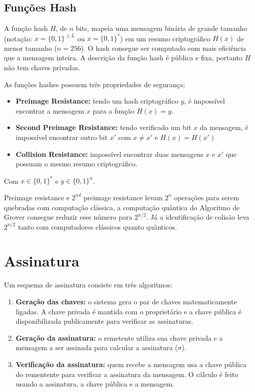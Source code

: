 \documentclass[12pt, a4paper]{report}
\begin{document}
\subsection{Funções Hash}
A função hash $H$, de $n$ bits, mapeia uma mensagem binária de grande tamanho (notação: $x = \{0,1\}^{\leq L}$ ou $x = \{0,1\}^{*}$) em um resumo criptográfico $H(x)$ de menor tamanho ($n = 256$). O hash consegue ser computado com mais eficiência que a mensagem inteira. A descrição da função hash é pública e fixa, portanto $H$ não tem chaves privadas.

As funções hashes possuem três propriedades de segurança:
\begin{itemize}
	\item \textbf{Preimage Resistance:} tendo um hash criptográfico $y$, é impossível encontrar a mensagem $x$ para a função $H(x) = y$.
	\item \textbf{Second Preimage Resistance:} tendo verificado um bit $x$ da mensagem, é impossível encontrar outro bit $x'$ com $x\neq x'$ e $H(x) = H(x')$
	\item \textbf{Collision Resistance:} impossível encontrar duas mensagens $x$ e $x'$ que possuam o mesmo resumo criptográfico.
\end{itemize}
Com $x \in \{0,1\}^*$ e $y \in \{0,1\}^n$.

Preimage resistance e $2^{nd}$ preimage resistance levam $2^n$ operações para serem quebradas com computação clássica, a computação quântica do Algoritmo de Grover consegue reduzir esse número para $2^{n/2}$. Já a identificação de colisão leva $2^{n/2}$ tanto com computadores clássicos quanto quânticos.


\section{Assinatura}
Um esquema de assinatura consiste em três algoritmos:
\begin{enumerate}
	\item \textbf{Geração das chaves:} o sistema gera o par de chaves matematicamente ligadas. A chave privada é mantida com o proprietário e a chave pública é disponibilizada publicamente para verificar as assinaturas.
	\item \textbf{Geração da assinatura:} o remetente utiliza sua chave privada e a mensagem a ser assinada para calcular a assinatura ($\sigma$).
	\item \textbf{Verificação da assinatura:} quem recebe a mensagem usa a chave pública do rementente para verificar a assinatura da mensagem. O cálculo é feito usando a assinatura, a chave pública e a mensagem.
\end{enumerate}
\end{document}
